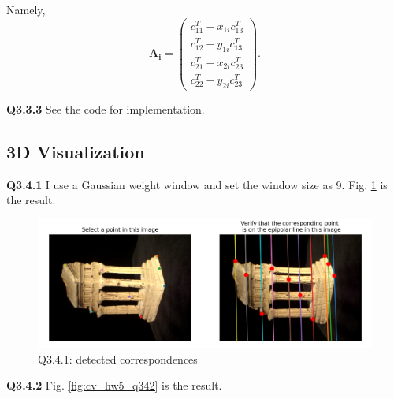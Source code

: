 \documentclass[
  course = {{16-720B Computer Vision}},
  quartile = {{1}},
  assignment = 5\ -\ 3D\ Reconstruction\ \&\ Photometric\ Stereo,
  name = {{Kangle Deng}},
  email = {{kangled@andrew.cmu.edu}},
  firstexercise = 1
]{aga-homework}
\begin{document}
Namely,
\begin{equation*}
    \mathbf{A_i} = \left(\begin{array}{c}
         c_{11}^T - x_{1i} c_{13}^T  \\
         c_{12}^T - y_{1i} c_{13}^T  \\
         c_{21}^T - x_{2i} c_{23}^T  \\
         c_{22}^T - y_{2i} c_{23}^T  
    \end{array}
    \right).
\end{equation*}

\noindent\textbf{Q3.3.3} See the code for implementation.

\subsection{3D Visualization}
\noindent\textbf{Q3.4.1} I use a Gaussian weight window and set the window size as 9. Fig. \ref{fig:cv_hw5_q341} is the result.

\begin{figure}
    \centering
    \includegraphics[width=.9\textwidth]{CV/fig/hw5/q341.png}
    \caption{Q3.4.1: detected correspondences}
    \label{fig:cv_hw5_q341}
\end{figure}

\noindent\textbf{Q3.4.2} Fig. \ref{fig:cv_hw5_q342} is the result.
\end{document}
